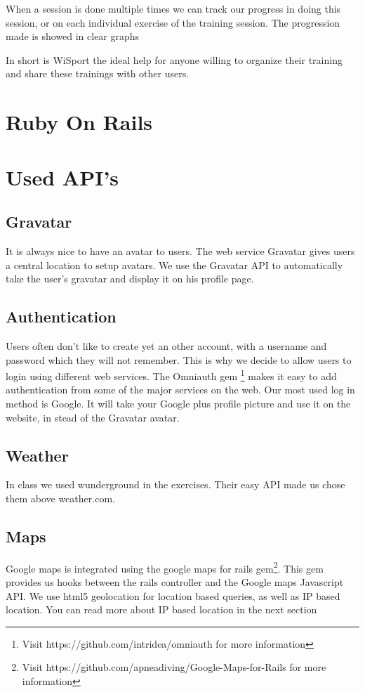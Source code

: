 \documentclass[11pt,a4paper]{scrartcl}
\begin{document}
When a session is done multiple times we can track our progress in doing this session, or on each individual exercise of the training session. The progression made is 
showed in clear graphs

In short is WiSport the ideal help for anyone willing to organize their training and share these trainings with other users.

\section{Ruby On Rails}

\section{Used API's}
\subsection{Gravatar}
It is always nice to have an avatar to users. The web service Gravatar gives users a central location to setup avatars. We use the Gravatar API to automatically take the user's gravatar and display it on his profile page.
\subsection{Authentication}
Users often don't like to create yet an other account, with a username and password which they will not remember. This is why we decide to allow users to login using different web services. The Omniauth gem \footnote{Visit https://github.com/intridea/omniauth for more information} makes it easy to add authentication from some of the major services on the web. Our most used log in method is Google. It will take your Google plus profile picture and use it on the website, in stead of the Gravatar avatar.
\subsection{Weather}
In class we used wunderground in the exercises. Their easy API made us chose them above weather.com.
\subsection{Maps}
Google maps is integrated using the google maps for rails gem\footnote{Visit https://github.com/apneadiving/Google-Maps-for-Rails for more information}. This gem provides us hooks between the rails controller and the Google maps Javascript API. We use html5 geolocation for location based queries, as well as IP based location. You can read more about IP based location in the next section
\end{document}
